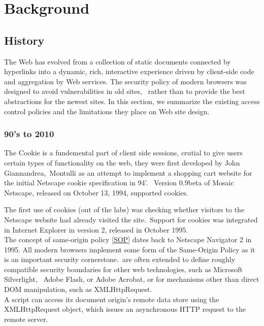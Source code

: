 
\chapter{Background}

\section{History}

The Web has evolved from a collection of static documents connected by hyperlinks into a dynamic, rich, interactive experience
driven by client-side code and aggregation by Web services. The security policy of modern browsers was designed to avoid vulnerabilities in old sites, \
rather than to provide the best abstractions for the newest sites. In this section, we summarize the existing access
control policies and the limitations they place on Web site design.



\subsection{90's to 2010}

The Cookie is a fundemental part of client side sessions, crutial to give users certain types of functionality on the web, they were first developed by John Giannandrea,\
Montulli as an attempt to implement a shopping cart website for the initial Netscape cookie specification in 94'. \
Version 0.9beta of Mosaic Netscape, released on October 13, 1994, supported cookies.\

The first use of cookies (out of the labs) was checking whether visitors to the Netscape website had already visited the site.\
Support for cookies was integrated in Internet Explorer in version 2, released in October 1995.\\

The concept of same-origin policy  \ref{SOP} dates back to Netscape Navigator 2 in 1995. All modern browsers implement some form of the Same-Origin Policy as it is an important security cornerstone.\
are often extended to define roughly compatible security boundaries for other web technologies, such as Microsoft Silverlight, \
Adobe Flash, or Adobe Acrobat, or for mechanisms other than direct DOM manipulation, such as XMLHttpRequest.\\

A script can access its document origin’s remote data store using the XMLHttpRequest object, which issues an asynchronous HTTP request to the remote server.\

